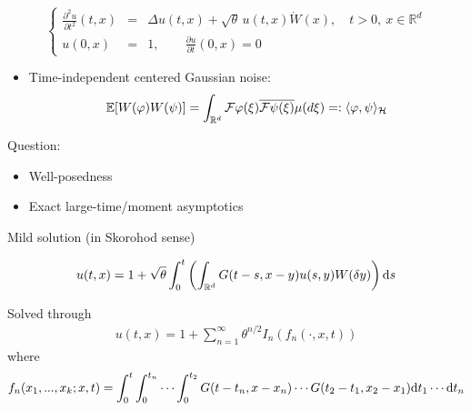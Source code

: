 \documentclass[9pt,table,xcolor=dvipsnames]{beamer}%
\begin{document}
\begin{frame} %
\begin{equation*}
 \left\{\begin{array}{rcl}
  \displaystyle \frac{\partial^2 u}{\partial t^2}(t,x) & = & \Delta u(t,x) + \sqrt{\theta}\,u(t,x)\dot{W}(x), \quad t>0,\: x \in \mathbb{R}^d \\[2ex]
  \displaystyle u(0,x) & = & 1, \qquad \displaystyle \frac{\partial u}{\partial t}(0,x)  =  0
 \end{array}\right.
  \end{equation*}
  \vfill
  \begin{itemize}
    \item Time-independent centered Gaussian noise:
    \begin{align*}
      \mathbb{E}[W(\varphi) W(\psi)] =  \int_{\mathbb{R}^d} \mathcal{F} \varphi(\xi) \overline{\mathcal{F} \psi(\xi)}\mu(d\xi) =: \langle \varphi,\psi \rangle_{\mathcal{H}}
    \end{align*}
    \end{itemize}
    \mySeparateLine
    \bigskip
    \begin{center}
    \begin{minipage}{0.6\textwidth}
    \centering
    \pause
    Question:
    \bigskip

    \begin{itemize}
      \item Well-posedness
      \item Exact large-time/moment asymptotics
    \end{itemize}
    \end{minipage}
    \end{center}
\end{frame}
\begin{frame}[fragile,t] %
  \begin{center}
    Mild solution (in Skorohod sense)
  \end{center}
  \begin{equation*}
    u(t,x) = 1 + \sqrt{\theta}\int_0^t \left( \int_{\mathbb{R}^d} G(t-s,x-y)u(s,y) W(\delta y) \right)\mathrm{d} s
  \end{equation*}
  \bigskip

  \pause
  Solved through
  \begin{align*}
    u(t,x) = 1 + \sum_{n=1}^\infty \theta^{n/2}I_n(f_n(\cdot,x,t))
  \end{align*}
  where
  \begin{align*}
    f_n(x_1,...,x_k;x,t) = \int_0^t \int_0^{t_n}\cdots \int_0^{t_2} G(t-t_n,x-x_n)\cdots G(t_2-t_1,x_2-x_1) \mathrm{d} t_1\cdots \mathrm{d} t_n
  \end{align*}
\end{frame}
\end{document}

